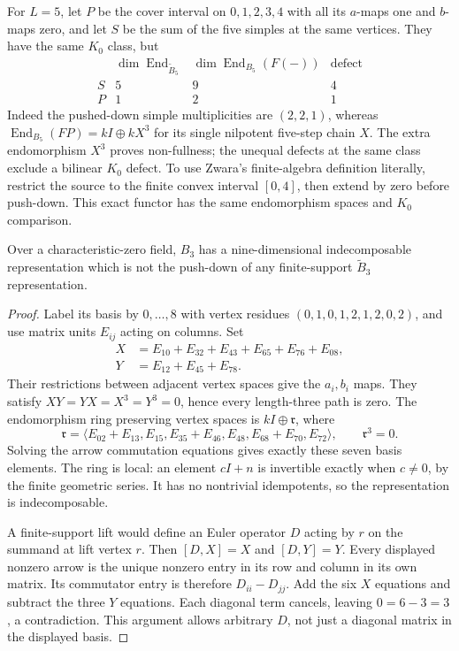 For $L=5$, let $P$ be the cover interval on $0,1,2,3,4$ with all its
$a$-maps one and $b$-maps zero, and let $S$ be the sum of the five simples
at the same vertices. They have the same $K_0$ class, but
\[
\begin{array}{c|ccc}
 &\dim\operatorname{End}_{\widetilde B_5}
 &\dim\operatorname{End}_{B_5}(F(-))&\text{defect}\\\hline
 S&5&9&4\\ P&1&2&1
\end{array}
\]
Indeed the pushed-down simple multiplicities are $(2,2,1)$, whereas
$\operatorname{End}_{B_5}(FP)=kI\oplus kX^3$ for its single nilpotent
five-step chain $X$. The extra endomorphism $X^3$ proves non-fullness;
the unequal defects at the same class exclude a bilinear $K_0$ defect.
To use Zwara's finite-algebra definition literally, restrict the source to
the finite convex interval $[0,4]$, then extend by zero before push-down.
This exact functor has the same endomorphism spaces and $K_0$ comparison.

\begin{proposition}
\label{cover:band}
Over a characteristic-zero field, $B_3$ has a nine-dimensional
indecomposable representation which is not the push-down of any
finite-support $\widetilde B_3$ representation.
\end{proposition}
\begin{proof}
Label its basis by $0,\ldots,8$ with vertex residues
$(0,1,0,1,2,1,2,0,2)$, and use matrix units $E_{ij}$ acting on columns.
Set
\begin{align*}
 X&=E_{10}+E_{32}+E_{43}+E_{65}+E_{76}+E_{08},\\
 Y&=E_{12}+E_{45}+E_{78}.
\end{align*}
Their restrictions between adjacent vertex spaces give the $a_i,b_i$ maps.
They satisfy $XY=YX=X^3=Y^3=0$, hence every length-three path is zero.
The endomorphism ring preserving vertex spaces is $kI\oplus\mathfrak r$,
where
\[
 \mathfrak r=\langle E_{02}+E_{13},E_{15},E_{35}+E_{46},
                       E_{48},E_{68}+E_{70},E_{72}\rangle,
 \qquad \mathfrak r^3=0.
\]
Solving the arrow commutation equations gives exactly these seven basis
elements. The ring is local: an element $cI+n$ is invertible exactly when
$c\ne0$, by the finite geometric series. It has no nontrivial idempotents,
so the representation is indecomposable.

A finite-support lift would define an Euler operator $D$ acting by $r$ on
the summand at lift vertex $r$. Then $[D,X]=X$ and $[D,Y]=Y$.
Every displayed nonzero arrow is the unique nonzero entry in its row and
column in its own matrix. Its commutator entry is therefore
$D_{ii}-D_{jj}$. Add the six $X$ equations and subtract the three $Y$
equations. Each diagonal term cancels, leaving $0=6-3=3$, a contradiction.
This argument allows arbitrary $D$, not just a diagonal matrix in the
displayed basis.
\end{proof}

